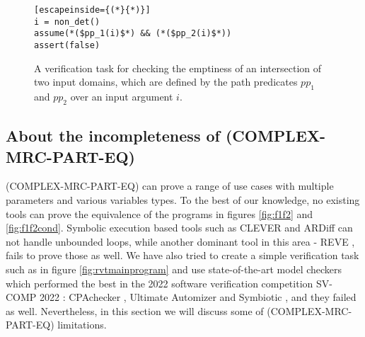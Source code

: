 \begin{figure} [h]
\begin{center}
\begin{minipage}{7 cm}
\begin{lstlisting}[escapeinside={(*}{*)}]
i = non_det()
assume(*($pp_1(i)$*) && (*($pp_2(i)$*))
assert(false)
\end{lstlisting}
\end{minipage}
\caption{A verification task for checking   the emptiness of an intersection of two input domains, which are defined by the path predicates $pp_1$ and $pp_2$ over an input argument $i$.}
\label{fig:checkfeasibility}
\end{center}
\end{figure}

\subsection{About the incompleteness of (COMPLEX-MRC-PART-EQ)}
(COMPLEX-MRC-PART-EQ) can prove a range of use cases with multiple parameters and various variables types. To the best of our knowledge, no existing tools can prove the equivalence of the programs in figures \ref{fig:f1f2} and \ref{fig:f1f2cond}. Symbolic execution based tools such as CLEVER \cite{9285657} and ARDiff \cite{10.1145/3368089.3409757} can not handle unbounded loops, while another dominant tool in this area - REVE \cite{FelsingGrebingKlebanov2014}, fails to prove those as well. We have also tried to create a simple verification task such as in figure \ref{fig:rvtmainprogram} and use state-of-the-art model checkers which performed the best in the 2022 software verification competition SV-COMP 2022 \cite{10.1007/978-3-030-99527-0_20}: CPAchecker \cite{10.1007/978-3-642-22110-1_16}, Ultimate Automizer \cite{10.1007/978-3-319-89963-3_30} and Symbiotic \cite{inbook}, and they failed as well. Nevertheless, in this section we will discuss some of (COMPLEX-MRC-PART-EQ) limitations.

